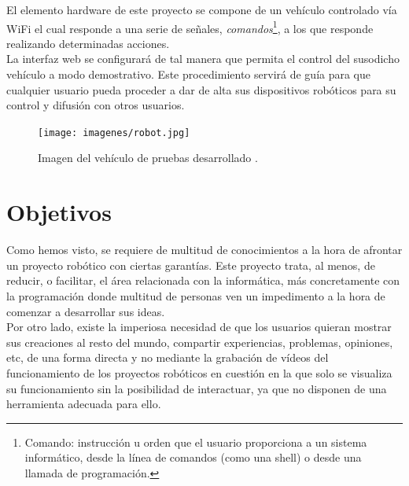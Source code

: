 El elemento hardware de este proyecto se compone de un vehículo controlado vía WiFi el cual responde a una serie de señales, \emph{comandos}\footnote{ Comando: instrucción u orden que el usuario proporciona a un sistema informático, 
desde la línea de comandos (como una shell) o desde una llamada de programación.}, a los que responde realizando determinadas acciones.\\

La interfaz web se configurará de tal manera que permita el control del susodicho vehículo a modo demostrativo. Este procedimiento servirá de guía para que cualquier usuario pueda proceder a dar de alta sus dispositivos 
robóticos para su control y difusión con otros usuarios.\\

\begin{figure}[H]
  \begin{center}
    \texttt{[image: imagenes/robot.jpg]}
  \end{center}
  \label{fig:logo}
 \caption{Imagen del vehículo de pruebas desarrollado \protect\footnotemark.}
\end{figure}



\section{Objetivos}
\label{sec:objetivos}

Como hemos visto, se requiere de multitud de conocimientos a la hora de afrontar un proyecto robótico con ciertas garantías. Este proyecto trata, al menos, de reducir, o facilitar, el área relacionada con
la informática, más concretamente con la programación donde multitud de personas ven un impedimento a la hora de comenzar a desarrollar sus ideas.\\

Por otro lado, existe la imperiosa necesidad de que los usuarios quieran mostrar sus creaciones al resto del mundo, compartir experiencias, problemas, opiniones, etc, de una forma directa y no
mediante la grabación de vídeos del funcionamiento de los proyectos robóticos en cuestión en la que solo se visualiza su funcionamiento sin la posibilidad de interactuar, ya que no disponen de una herramienta adecuada para ello.\\

